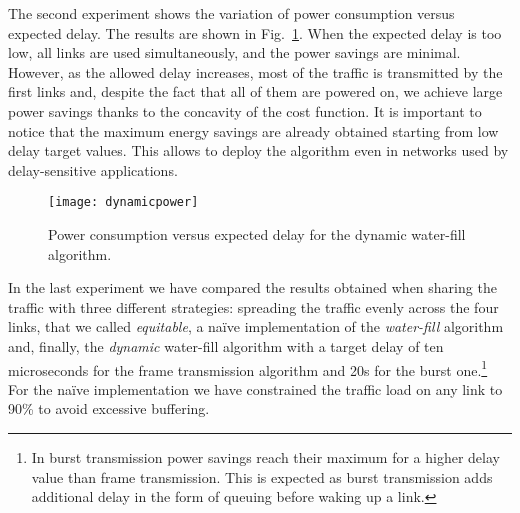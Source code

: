 \documentclass[journal,english,twocolumn,10pt,letterpaper]{IEEEtran}
\newcommand{\added}[1]{{#1}}
\begin{document}
The second experiment shows the variation of power consumption versus expected
delay. The results are shown in \added{Fig.}~\ref{fig:powervsdelay}. When the
expected delay is too low, all links are used simultaneously, and the power
savings are minimal. However, as the allowed delay increases, most of the
traffic is transmitted by the first links and, despite the fact that all of
them are powered on, we achieve large power savings thanks to the concavity of
the cost function. It is important to notice that the maximum energy savings
are already obtained starting from low delay target values. This allows to
deploy the algorithm even in networks used by delay-sensitive applications.
\begin{figure}
  \centering
  \texttt{[image: dynamicpower]}
  \caption{Power consumption versus expected delay for the dynamic water-fill algorithm.}
  \label{fig:powervsdelay}
\end{figure}

In the last experiment we have compared the results obtained when sharing the
traffic with three different strategies: spreading the traffic evenly across
the four links, that we called \emph{equitable}, a naïve implementation of the
\emph{water-fill} algorithm and, finally, the \emph{dynamic} water-fill
algorithm with a target delay of ten microseconds for the frame transmission
algorithm and 20s for the burst one.\footnote{In burst transmission
  power savings reach their maximum for a higher delay value than frame
  transmission. This is expected as burst transmission adds additional delay
  in the form of queuing before waking up a link.} For the naïve
implementation we have constrained the traffic load on any link to 90\% to
avoid excessive buffering.
\end{document}
